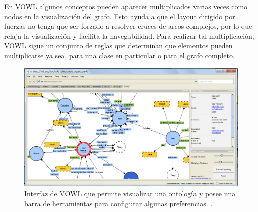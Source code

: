 En VOWL algunos conceptos pueden aparecer multiplicados varias veces como nodos en la visualización del grafo. Esto ayuda a que el layout dirigido por fuerzas no tenga que ser forzado a resolver cruces de arcos complejos, por lo que relaja la visualización y facilita la navegabilidad. Para realizar tal multiplicación, VOWL sigue un conjunto de reglas que determinan que elementos pueden multiplicarse ya sea, para una clase en particular o para el grafo completo.

\begin{figure}[H]
	\centering
	\includegraphics[width=13cm]{imagenes/vowl.png}
	\caption{Interfaz de VOWL que permite visualizar una ontología y posee una barra de herramientas para configurar algunas preferencias. \cite{lohmann2016visualizing}.}
	\label{fig:vowl}
\end{figure}



